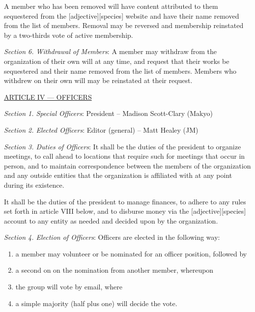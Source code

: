 \documentclass{article}
\begin{document}
A member who has been removed will have content attributed to them sequestered from the [adjective][species] website and have their name removed from the list of members.  Removal may be reversed and membership reinstated by a two-thirds vote of active membership.

\emph{Section 6. Withdrawal of Members}: A member may withdraw from the organization of their own will at any time, and request that their works be sequestered and their name removed from the list of members.  Members who withdrew on their own will may be reinstated at their request.

\bigskip

\large{\underline{ARTICLE IV --- OFFICERS}}

\emph{Section 1. Special Officers}: President -- Madison Scott-Clary (Makyo)

\emph{Section 2. Elected Officers}: Editor (general) -- Matt Healey (JM)

\emph{Section 3. Duties of Officers}: It shall be the duties of the president to organize meetings, to call ahead to locations that require such for meetings that occur in person, and to maintain correspondence between the members of the organization and any outside entities that the organization is affiliated with at any point during its existence.

It shall be the duties of the president to manage finances, to adhere to any rules set forth in article VIII below, and to disburse money via the [adjective][species] account to any entity as needed and decided upon by the organization.

\emph{Section 4. Election of Officers}: Officers are elected in the following way:
\begin{enumerate}
  \item a member may volunteer or be nominated for an officer position, followed by
  \item a second on on the nomination from another member, whereupon
  \item the group will vote by email, where
  \item a simple majority (half plus one) will decide the vote.
\end{enumerate}
\end{document}
